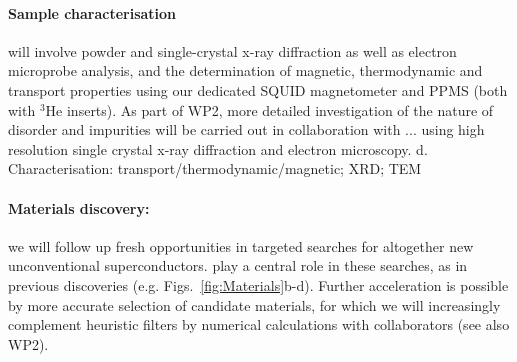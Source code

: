 \paragraph {Sample characterisation} will involve powder and
single-crystal x-ray diffraction as well as electron microprobe analysis,
and the determination of magnetic, thermodynamic and transport
properties using our dedicated
SQUID magnetometer and PPMS (both with $^3$He inserts).  
As part of WP2, more detailed investigation of the nature of disorder and impurities will be carried out in collaboration with ... using high resolution single crystal x-ray diffraction and electron microscopy.
d. Characterisation: transport/thermodynamic/magnetic; XRD; TEM


\paragraph{Materials discovery:}
we will follow up fresh opportunities in targeted searches for altogether new unconventional superconductors. %
 play a central role in these searches, as in previous discoveries (e.g. Figs.~\ref{fig:Materials}b-d). %
Further acceleration is possible  by more accurate selection of candidate materials, for which we will increasingly complement heuristic filters by numerical calculations with collaborators (see also WP2).  






\\
\\

